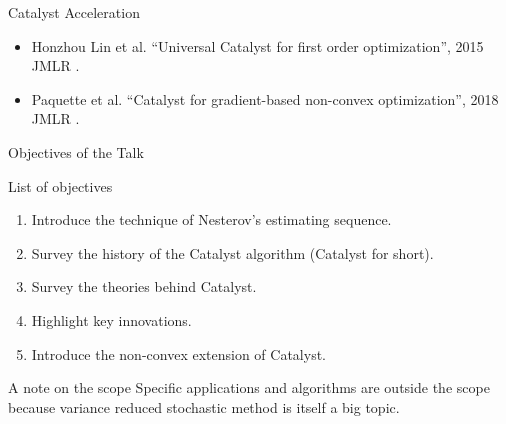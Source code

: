 \documentclass[11pt]{beamer}
\begin{document}
        \begin{frame}{Catalyst Acceleration}
            \begin{figure}
                \centering
            \end{figure}
            \begin{itemize}
                \item Honzhou Lin et al. ``Universal Catalyst for first order optimization'', 2015 JMLR \cite{lin_universal_2015}.
                \item Paquette et al. ``Catalyst for gradient-based non-convex optimization'', 2018 JMLR \cite{paquette_catalyst_2018}. 
            \end{itemize}
        \end{frame}
        \begin{frame}{Objectives of the Talk}
            \begin{block}{List of objectives}
                \begin{enumerate}
                    \item Introduce the technique of Nesterov's estimating sequence. 
                    \item Survey the history of the Catalyst algorithm (Catalyst for short).  
                    \item Survey the theories behind Catalyst. 
                    \item Highlight key innovations. 
                    \item Introduce the non-convex extension of Catalyst. 
                \end{enumerate}
            \end{block}
            \pause
            \begin{block}{A note on the scope}
                Specific applications and algorithms are outside the scope because variance reduced stochastic method is itself a big topic.     
            \end{block}
        \end{frame}
\end{document}
